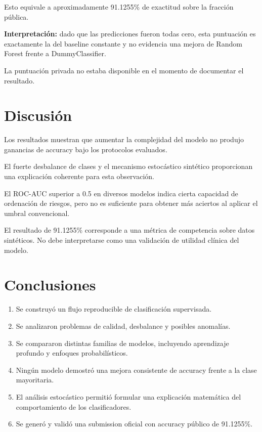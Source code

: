 ﻿\documentclass[11pt,a4paper]{article}
\begin{document}
Esto equivale a aproximadamente 91.1255\%
de exactitud sobre la fracción pública.

\textbf{Interpretación:} dado que las predicciones
fueron todas cero, esta puntuación es exactamente
la del baseline constante y no evidencia una
mejora de Random Forest frente a DummyClassifier.

La puntuación privada no estaba disponible
en el momento de documentar el resultado.

\section{Discusión}

Los resultados muestran que aumentar la
complejidad del modelo no produjo ganancias
de accuracy bajo los protocolos evaluados.

El fuerte desbalance de clases y el mecanismo
estocástico sintético proporcionan una
explicación coherente para esta observación.

El ROC-AUC superior a 0.5 en diversos modelos
indica cierta capacidad de ordenación de riesgos,
pero no es suficiente para obtener más aciertos
al aplicar el umbral convencional.

El resultado de 91.1255\% corresponde a
una métrica de competencia sobre datos sintéticos.
No debe interpretarse como una validación
de utilidad clínica del modelo.

\section{Conclusiones}

\begin{enumerate}
\item Se construyó un flujo reproducible
de clasificación supervisada.
\item Se analizaron problemas de calidad,
desbalance y posibles anomalías.
\item Se compararon distintas familias de modelos,
incluyendo aprendizaje profundo y enfoques
probabilísticos.
\item Ningún modelo demostró una mejora consistente
de accuracy frente a la clase mayoritaria.
\item El análisis estocástico permitió formular
una explicación matemática del comportamiento
de los clasificadores.
\item Se generó y validó una submission oficial
con accuracy público de 91.1255\%.
\end{enumerate}
\end{document}
